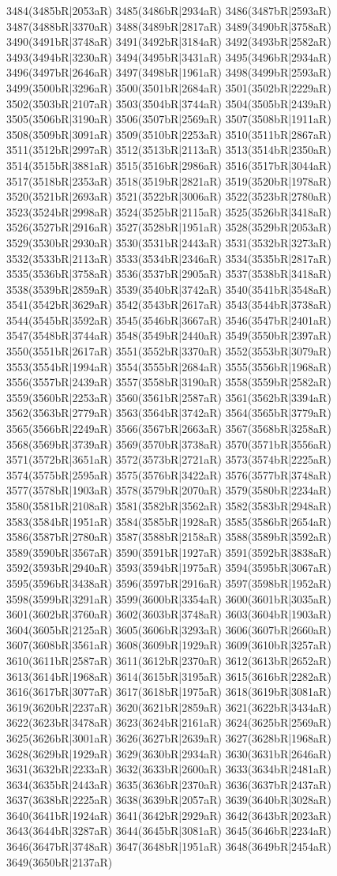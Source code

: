 3484(3485bR|2053aR) 3485(3486bR|2934aR) 3486(3487bR|2593aR) 3487(3488bR|3370aR) 3488(3489bR|2817aR) 3489(3490bR|3758aR) 3490(3491bR|3748aR) 3491(3492bR|3184aR) 3492(3493bR|2582aR) 3493(3494bR|3230aR) 3494(3495bR|3431aR) 3495(3496bR|2934aR) 3496(3497bR|2646aR) 3497(3498bR|1961aR) 3498(3499bR|2593aR) 3499(3500bR|3296aR) 3500(3501bR|2684aR) 3501(3502bR|2229aR) 3502(3503bR|2107aR) 3503(3504bR|3744aR) 3504(3505bR|2439aR) 3505(3506bR|3190aR) 3506(3507bR|2569aR) 3507(3508bR|1911aR) 3508(3509bR|3091aR) 3509(3510bR|2253aR) 3510(3511bR|2867aR) 3511(3512bR|2997aR) 3512(3513bR|2113aR) 3513(3514bR|2350aR) 3514(3515bR|3881aR) 3515(3516bR|2986aR) 3516(3517bR|3044aR) 3517(3518bR|2353aR) 3518(3519bR|2821aR) 3519(3520bR|1978aR) 3520(3521bR|2693aR) 3521(3522bR|3006aR) 3522(3523bR|2780aR) 3523(3524bR|2998aR) 3524(3525bR|2115aR) 3525(3526bR|3418aR) 3526(3527bR|2916aR) 3527(3528bR|1951aR) 3528(3529bR|2053aR) 3529(3530bR|2930aR) 3530(3531bR|2443aR) 3531(3532bR|3273aR) 3532(3533bR|2113aR) 3533(3534bR|2346aR) 3534(3535bR|2817aR) 3535(3536bR|3758aR) 3536(3537bR|2905aR) 3537(3538bR|3418aR) 3538(3539bR|2859aR) 3539(3540bR|3742aR) 3540(3541bR|3548aR) 3541(3542bR|3629aR) 3542(3543bR|2617aR) 3543(3544bR|3738aR) 3544(3545bR|3592aR) 3545(3546bR|3667aR) 3546(3547bR|2401aR) 3547(3548bR|3744aR) 3548(3549bR|2440aR) 3549(3550bR|2397aR) 3550(3551bR|2617aR) 3551(3552bR|3370aR) 3552(3553bR|3079aR) 3553(3554bR|1994aR) 3554(3555bR|2684aR) 3555(3556bR|1968aR) 3556(3557bR|2439aR) 3557(3558bR|3190aR) 3558(3559bR|2582aR) 3559(3560bR|2253aR) 3560(3561bR|2587aR) 3561(3562bR|3394aR) 3562(3563bR|2779aR) 3563(3564bR|3742aR) 3564(3565bR|3779aR) 3565(3566bR|2249aR) 3566(3567bR|2663aR) 3567(3568bR|3258aR) 3568(3569bR|3739aR) 3569(3570bR|3738aR) 3570(3571bR|3556aR) 3571(3572bR|3651aR) 3572(3573bR|2721aR) 3573(3574bR|2225aR) 3574(3575bR|2595aR) 3575(3576bR|3422aR) 3576(3577bR|3748aR) 3577(3578bR|1903aR) 3578(3579bR|2070aR) 3579(3580bR|2234aR) 3580(3581bR|2108aR) 3581(3582bR|3562aR) 3582(3583bR|2948aR) 3583(3584bR|1951aR) 3584(3585bR|1928aR) 3585(3586bR|2654aR) 3586(3587bR|2780aR) 3587(3588bR|2158aR) 3588(3589bR|3592aR) 3589(3590bR|3567aR) 3590(3591bR|1927aR) 3591(3592bR|3838aR) 3592(3593bR|2940aR) 3593(3594bR|1975aR) 3594(3595bR|3067aR) 3595(3596bR|3438aR) 3596(3597bR|2916aR) 3597(3598bR|1952aR) 3598(3599bR|3291aR) 3599(3600bR|3354aR) 3600(3601bR|3035aR) 3601(3602bR|3760aR) 3602(3603bR|3748aR) 3603(3604bR|1903aR) 3604(3605bR|2125aR) 3605(3606bR|3293aR) 3606(3607bR|2660aR) 3607(3608bR|3561aR) 3608(3609bR|1929aR) 3609(3610bR|3257aR) 3610(3611bR|2587aR) 3611(3612bR|2370aR) 3612(3613bR|2652aR) 3613(3614bR|1968aR) 3614(3615bR|3195aR) 3615(3616bR|2282aR) 3616(3617bR|3077aR) 3617(3618bR|1975aR) 3618(3619bR|3081aR) 3619(3620bR|2237aR) 3620(3621bR|2859aR) 3621(3622bR|3434aR) 3622(3623bR|3478aR) 3623(3624bR|2161aR) 3624(3625bR|2569aR) 3625(3626bR|3001aR) 3626(3627bR|2639aR) 3627(3628bR|1968aR) 3628(3629bR|1929aR) 3629(3630bR|2934aR) 3630(3631bR|2646aR) 3631(3632bR|2233aR) 3632(3633bR|2600aR) 3633(3634bR|2481aR) 3634(3635bR|2443aR) 3635(3636bR|2370aR) 3636(3637bR|2437aR) 3637(3638bR|2225aR) 3638(3639bR|2057aR) 3639(3640bR|3028aR) 3640(3641bR|1924aR) 3641(3642bR|2929aR) 3642(3643bR|2023aR) 3643(3644bR|3287aR) 3644(3645bR|3081aR) 3645(3646bR|2234aR) 3646(3647bR|3748aR) 3647(3648bR|1951aR) 3648(3649bR|2454aR) 3649(3650bR|2137aR) 
